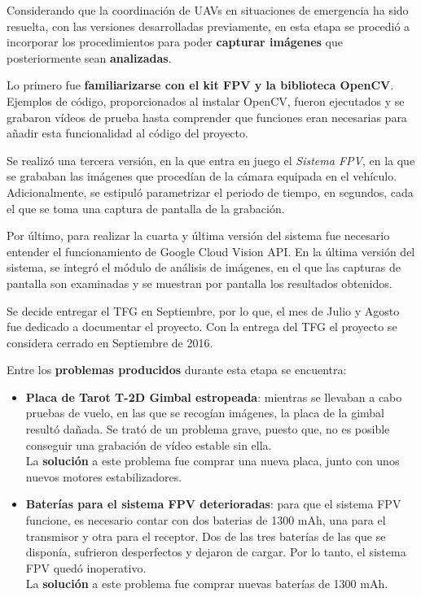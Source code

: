 Considerando que la coordinación de \acs{UAV}s en situaciones de emergencia ha sido resuelta, con las versiones desarrolladas previamente, en esta etapa se procedió a incorporar los procedimientos para poder \textbf{capturar imágenes} que posteriormente sean \textbf{analizadas}.

Lo primero fue \textbf{familiarizarse con el kit \acs{FPV} y la biblioteca OpenCV}. Ejemplos de código, proporcionados al instalar OpenCV, fueron ejecutados y se grabaron vídeos de prueba hasta comprender que funciones eran necesarias para añadir esta funcionalidad al código del proyecto.

Se realizó una tercera versión, en la que entra en juego el \textit{Sistema FPV}, en la que se grababan las imágenes que procedían de la cámara equipada en el vehículo. Adicionalmente, se estipuló parametrizar el periodo de tiempo, en segundos, cada el que se toma una captura de pantalla de la grabación.

Por último, para realizar la cuarta y última versión del sistema fue necesario entender el funcionamiento de Google Cloud Vision \acs{API}. En la última versión del sistema, se integró el módulo de análisis de imágenes, en el que las capturas de pantalla son examinadas y se muestran por pantalla los resultados obtenidos.

Se decide entregar el \acs{TFG} en Septiembre, por lo que, el mes de Julio y Agosto fue dedicado a documentar el proyecto. Con la entrega del \acs{TFG} el proyecto se considera cerrado en Septiembre de 2016.

Entre los \textbf{problemas producidos} durante esta etapa se encuentra:
\begin{itemize}
\item \textbf{Placa de Tarot T-2D Gimbal estropeada}: mientras se llevaban a cabo pruebas de vuelo, en las que se recogían imágenes, la placa de la gimbal resultó dañada. Se trató de un problema grave, puesto que, no es posible conseguir una grabación de vídeo estable sin ella. \\ La \textbf{solución} a este problema fue comprar una nueva placa, junto con unos nuevos motores estabilizadores.
\item \textbf{Baterías para el sistema \acs{FPV} deterioradas}: para que el sistema \acs{FPV} funcione, es necesario contar con dos baterias de 1300 mAh, una para el transmisor y otra para el receptor. Dos de las tres baterías de las que se disponía, sufrieron desperfectos y dejaron de cargar. Por lo tanto, el sistema \acs{FPV} quedó inoperativo. \\ La \textbf{solución} a este problema fue comprar nuevas baterías de 1300 mAh.
\end{itemize}
 
